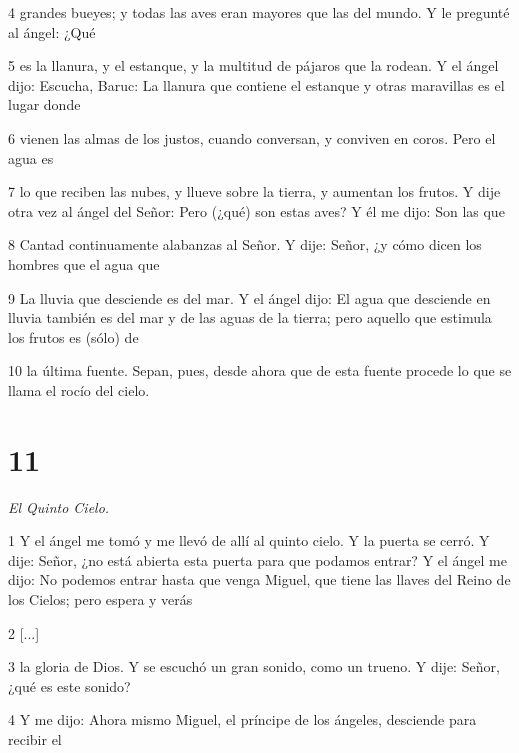 \par 4 grandes bueyes; y todas las aves eran mayores que las del mundo. Y le pregunté al ángel: ¿Qué

\par 5 es la llanura, y el estanque, y la multitud de pájaros que la rodean. Y el ángel dijo: Escucha, Baruc: La llanura que contiene el estanque y otras maravillas es el lugar donde

\par 6 vienen las almas de los justos, cuando conversan, y conviven en coros. Pero el agua es

\par 7 lo que reciben las nubes, y llueve sobre la tierra, y aumentan los frutos. Y dije otra vez al ángel del Señor: Pero (¿qué) son estas aves? Y él me dijo: Son las que

\par 8 Cantad continuamente alabanzas al Señor. Y dije: Señor, ¿y cómo dicen los hombres que el agua que

\par 9 La lluvia que desciende es del mar. Y el ángel dijo: El agua que desciende en lluvia también es del mar y de las aguas de la tierra; pero aquello que estimula los frutos es (sólo) de

\par 10 la última fuente. Sepan, pues, desde ahora que de esta fuente procede lo que se llama el rocío del cielo.

\chapter{11}

\par \textit{El Quinto Cielo.}

\par 1 Y el ángel me tomó y me llevó de allí al quinto cielo. Y la puerta se cerró. Y dije: Señor, ¿no está abierta esta puerta para que podamos entrar? Y el ángel me dijo: No podemos entrar hasta que venga Miguel, que tiene las llaves del Reino de los Cielos; pero espera y verás

\par 2 [...]

\par 3 la gloria de Dios. Y se escuchó un gran sonido, como un trueno. Y dije: Señor, ¿qué es este sonido?

\par 4 Y me dijo: Ahora mismo Miguel, el príncipe de los ángeles, desciende para recibir el

